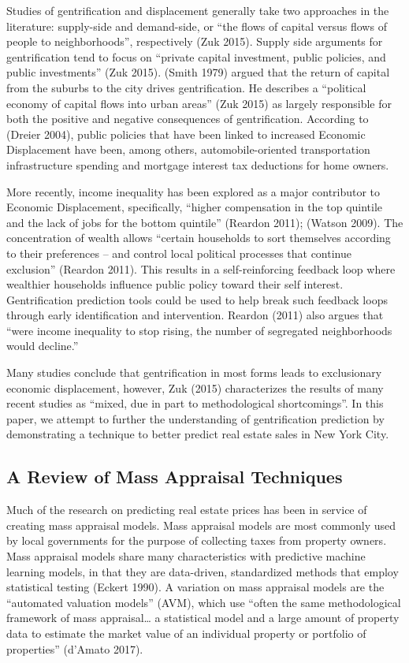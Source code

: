 \documentclass[12pt,]{article}
\begin{document}
Studies of gentrification and displacement generally take two approaches
in the literature: supply-side and demand-side, or ``the flows of
capital versus flows of people to neighborhoods'', respectively (Zuk
2015). Supply side arguments for gentrification tend to focus on
``private capital investment, public policies, and public investments''
(Zuk 2015). (Smith 1979) argued that the return of capital from the
suburbs to the city drives gentrification. He describes a ``political
economy of capital flows into urban areas'' (Zuk 2015) as largely
responsible for both the positive and negative consequences of
gentrification. According to (Dreier 2004), public policies that have
been linked to increased Economic Displacement have been, among others,
automobile-oriented transportation infrastructure spending and mortgage
interest tax deductions for home owners.

More recently, income inequality has been explored as a major
contributor to Economic Displacement, specifically, ``higher
compensation in the top quintile and the lack of jobs for the bottom
quintile'' (Reardon 2011); (Watson 2009). The concentration of wealth
allows ``certain households to sort themselves according to their
preferences -- and control local political processes that continue
exclusion'' (Reardon 2011). This results in a self-reinforcing feedback
loop where wealthier households influence public policy toward their
self interest. Gentrification prediction tools could be used to help
break such feedback loops through early identification and intervention.
Reardon (2011) also argues that ``were income inequality to stop rising,
the number of segregated neighborhoods would decline.''

Many studies conclude that gentrification in most forms leads to
exclusionary economic displacement, however, Zuk (2015) characterizes
the results of many recent studies as ``mixed, due in part to
methodological shortcomings''. In this paper, we attempt to further the
understanding of gentrification prediction by demonstrating a technique
to better predict real estate sales in New York City.

\hypertarget{a-review-of-mass-appraisal-techniques}{%
\subsection{A Review of Mass Appraisal
Techniques}\label{a-review-of-mass-appraisal-techniques}}

Much of the research on predicting real estate prices has been in
service of creating mass appraisal models. Mass appraisal models are
most commonly used by local governments for the purpose of collecting
taxes from property owners. Mass appraisal models share many
characteristics with predictive machine learning models, in that they
are data-driven, standardized methods that employ statistical testing
(Eckert 1990). A variation on mass appraisal models are the ``automated
valuation models'' (AVM), which use ``often the same methodological
framework of mass appraisal\ldots{} a statistical model and a large
amount of property data to estimate the market value of an individual
property or portfolio of properties'' (d'Amato 2017).
\end{document}

